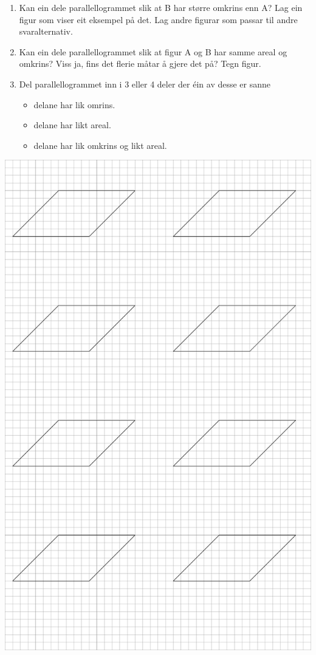 


\pagestyle{empty}
\begin{enumerate}[label=(\alph*)]
	\item Kan ein dele parallellogrammet slik at B har større omkrins enn A? Lag ein figur som viser eit eksempel på det. Lag andre figurar som passar til andre svaralternativ.
	\item Kan ein dele parallellogrammet slik at figur A og B har samme areal og omkrins? Viss ja, fins det flerie måtar å gjere det på? Tegn figur.
	\item Del parallellogrammet inn i 3 eller 4 deler der éin av desse er sanne
	\begin{itemize}
		\item delane har lik omrins.
		\item delane har likt areal.
		\item delane har lik omkrins og likt areal. 
	\end{itemize}
\end{enumerate}	
	
\newpage	
\pagestyle{empty}
\includegraphics[]{par}




